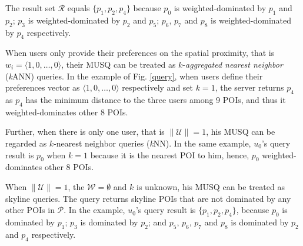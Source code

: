 \documentclass[10pt, conference, compsocconf]{IEEEtran}
\begin{document}
The result set $\mathcal{R}$ equals $\{p_1,p_2,p_4\}$ because $p_0$ is weighted-dominated by $p_1$ and $p_2$; $p_3$ is weighted-dominated by $p_2$ and $p_5$; $p_6$, $p_7$ and $p_8$ is weighted-dominated by $p_4$ respectively. 

When users only provide their preferences on the spatial proximity, that is $w_{i}=\langle 1,0,\ldots,0\rangle$, their MUSQ can be treated as $k$-\emph{aggregated nearest neighbor} (\emph{k}ANN) queries. In the example of Fig. \ref{query}, when users define their preferences vector as $\langle 1,0,\ldots,0\rangle$ respectively and set $k=1$, the server returns $p_4$ as $p_4$ has the minimum distance to the three users among 9 POIs, and thus it weighted-dominates other 8 POIs. 

Further, when there is only one user, that is $\|\mathcal{U}\|=1$, his MUSQ can be regarded as $k$-nearest neighbor queries (\emph{k}NN). In the same example, $u_0$'s query result is $p_0$ when $k=1$ because it is the nearest POI to him, hence, $p_0$ weighted-dominates other 8 POIs.

When $\|\mathcal{U}\|=1$, the $\mathcal{W}=\emptyset$ and $k$ is unknown, his MUSQ can be treated as skyline queries. The query returns skyline POIs that are not dominated by any other POIs in $\mathcal{P}$. In the example,  $u_0$'s query result is $\{p_1,p_2,p_4\}$, because $p_0$ is dominated by $p_1$; $p_3$ is dominated by $p_2$; and $p_5$, $p_6$, $p_7$ and $p_8$ is dominated by $p_2$ and $p_4$ respectively.

\begin{table}
	\centering
	\qquad
	\caption{User Group Information}
	\label{Usergroupinformation}
\end{table}
\end{document}
